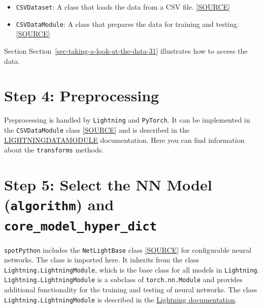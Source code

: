 \documentclass[
  letterpaper,
  DIV=11,
  numbers=noendperiod]{scrreprt}
\providecommand{\tightlist}{%
  \setlength{\itemsep}{0pt}\setlength{\parskip}{0pt}}\usepackage{longtable,booktabs,array}
\begin{document}
\begin{itemize}
\tightlist
\item
  \texttt{CSVDataset}: A class that loads the data from a CSV file.
  \href{https://github.com/sequential-parameter-optimization/spotPython/blob/main/src/spotPython/light/csvdataset.py}{{[}SOURCE{]}}
\item
  \texttt{CSVDataModule}: A class that prepares the data for training
  and testing.
  \href{https://github.com/sequential-parameter-optimization/spotPython/blob/main/src/spotPython/light/csvdatamodule.py}{{[}SOURCE{]}}
\end{itemize}

Section Section~\ref{sec-taking-a-look-at-the-data-31} illustrates how
to access the data.

\hypertarget{sec-preprocessing-31}{%
\section{Step 4: Preprocessing}\label{sec-preprocessing-31}}

Preprocessing is handled by \texttt{Lightning} and \texttt{PyTorch}. It
can be implemented in the \texttt{CSVDataModule} class
\href{https://github.com/sequential-parameter-optimization/spotPython/blob/main/src/spotPython/light/csvdatamodule.py}{{[}SOURCE{]}}
and is described in the
\href{https://lightning.ai/docs/pytorch/stable/data/datamodule.html}{LIGHTNINGDATAMODULE}
documentation. Here you can find information about the
\texttt{transforms} methods.

\hypertarget{sec-selection-of-the-algorithm-31}{%
\section{\texorpdfstring{Step 5: Select the NN Model
(\texttt{algorithm}) and
\texttt{core\_model\_hyper\_dict}}{Step 5: Select the NN Model (algorithm) and core\_model\_hyper\_dict}}\label{sec-selection-of-the-algorithm-31}}

\texttt{spotPython} includes the \texttt{NetLightBase} class
\href{https://github.com/sequential-parameter-optimization/spotPython/blob/main/src/spotPython/light/netlightbase.py}{{[}SOURCE{]}}
for configurable neural networks. The class is imported here. It
inherits from the class \texttt{Lightning.LightningModule}, which is the
base class for all models in \texttt{Lightning}.
\texttt{Lightning.LightningModule} is a subclass of
\texttt{torch.nn.Module} and provides additional functionality for the
training and testing of neural networks. The class
\texttt{Lightning.LightningModule} is described in the
\href{https://lightning.ai/docs/pytorch/stable/common/lightning_module.html}{Lightning
documentation}.
\end{document}
